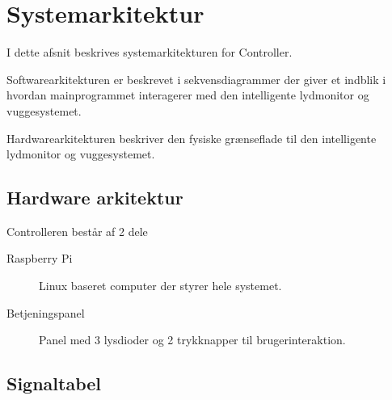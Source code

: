 \section{Systemarkitektur}

I dette afsnit beskrives systemarkitekturen for Controller.

Softwarearkitekturen er beskrevet i sekvensdiagrammer der giver et indblik i hvordan mainprogrammet interagerer med den intelligente lydmonitor og vuggesystemet.

Hardwarearkitekturen beskriver den fysiske grænseflade til den intelligente lydmonitor og vuggesystemet.



\subsection{Hardware arkitektur}


Controlleren består af 2 dele
\begin{description}
\item[Raspberry Pi] Linux baseret computer der styrer hele systemet. 
\item[Betjeningspanel] Panel med 3 lysdioder og 2 trykknapper til brugerinteraktion.
\end{description}

\subsection{Signaltabel}

